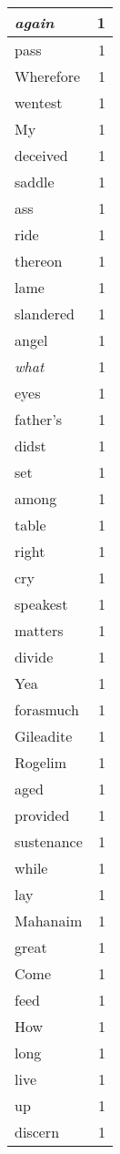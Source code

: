 \begin{center}
\begin{longtable}{l|r}
\emph{again} & 1 \\ \hline
pass & 1 \\ \hline
Wherefore & 1 \\ \hline
wentest & 1 \\ \hline
My & 1 \\ \hline
deceived & 1 \\ \hline
saddle & 1 \\ \hline
ass & 1 \\ \hline
ride & 1 \\ \hline
thereon & 1 \\ \hline
lame & 1 \\ \hline
slandered & 1 \\ \hline
angel & 1 \\ \hline
\emph{what} & 1 \\ \hline
eyes & 1 \\ \hline
father's & 1 \\ \hline
didst & 1 \\ \hline
set & 1 \\ \hline
among & 1 \\ \hline
table & 1 \\ \hline
right & 1 \\ \hline
cry & 1 \\ \hline
speakest & 1 \\ \hline
matters & 1 \\ \hline
divide & 1 \\ \hline
Yea & 1 \\ \hline
forasmuch & 1 \\ \hline
Gileadite & 1 \\ \hline
Rogelim & 1 \\ \hline
aged & 1 \\ \hline
provided & 1 \\ \hline
sustenance & 1 \\ \hline
while & 1 \\ \hline
lay & 1 \\ \hline
Mahanaim & 1 \\ \hline
great & 1 \\ \hline
Come & 1 \\ \hline
feed & 1 \\ \hline
How & 1 \\ \hline
long & 1 \\ \hline
live & 1 \\ \hline
up & 1 \\ \hline
discern & 1 \\ \hline

\end{longtable}
\end{center}
